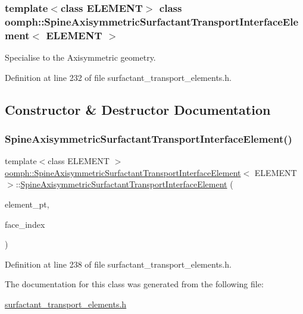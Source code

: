 \subsubsection*{template$<$class E\+L\+E\+M\+E\+NT$>$\newline
class oomph\+::\+Spine\+Axisymmetric\+Surfactant\+Transport\+Interface\+Element$<$ E\+L\+E\+M\+E\+N\+T $>$}

Specialise to the Axisymmetric geometry. 

Definition at line 232 of file surfactant\+\_\+transport\+\_\+elements.\+h.



\subsection{Constructor \& Destructor Documentation}
\mbox{\label{classoomph_1_1SpineAxisymmetricSurfactantTransportInterfaceElement_a60ac6b568dc388e584d423d4b4e9438a}} 
\subsubsection{\texorpdfstring{Spine\+Axisymmetric\+Surfactant\+Transport\+Interface\+Element()}{SpineAxisymmetricSurfactantTransportInterfaceElement()}}
{\footnotesize\ttfamily template$<$class E\+L\+E\+M\+E\+NT $>$ \\
\hyperlink{classoomph_1_1SpineAxisymmetricSurfactantTransportInterfaceElement}{oomph\+::\+Spine\+Axisymmetric\+Surfactant\+Transport\+Interface\+Element}$<$ E\+L\+E\+M\+E\+NT $>$\+::\hyperlink{classoomph_1_1SpineAxisymmetricSurfactantTransportInterfaceElement}{Spine\+Axisymmetric\+Surfactant\+Transport\+Interface\+Element} (\begin{DoxyParamCaption}\item[{Finite\+Element $\ast$const \&}]{element\+\_\+pt,  }\item[{const int \&}]{face\+\_\+index }\end{DoxyParamCaption})\hspace{0.3cm}{\ttfamily [inline]}}



Definition at line 238 of file surfactant\+\_\+transport\+\_\+elements.\+h.



The documentation for this class was generated from the following file\+:\begin{DoxyCompactItemize}
\item 
\hyperlink{surfactant__transport__elements_8h}{surfactant\+\_\+transport\+\_\+elements.\+h}\end{DoxyCompactItemize}
